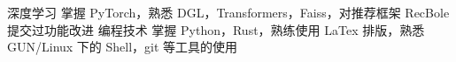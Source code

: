 

\begin{cvskills}
  \cvskill
    {深度学习} %
    {掌握 PyTorch，熟悉 DGL，Transformers，Faiss，对推荐框架 RecBole 提交过功能改进} %
  \cvskill
    {编程技术} %
    {掌握 Python，Rust，熟练使用 LaTex 排版，熟悉 GUN/Linux 下的 Shell，git 等工具的使用}

\end{cvskills}
